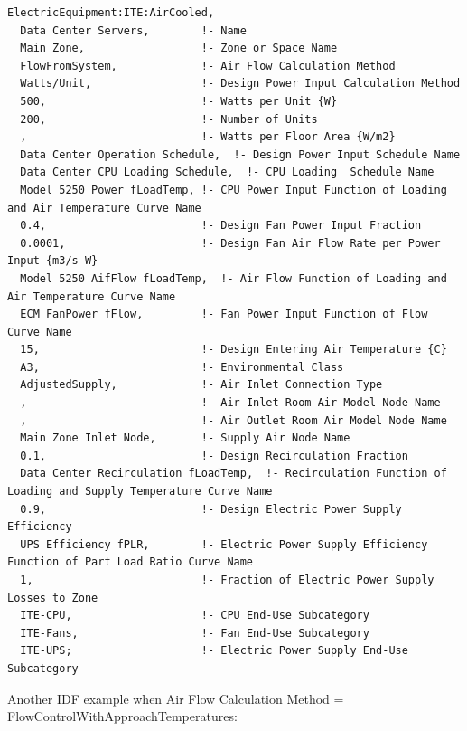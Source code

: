 \begin{lstlisting}
ElectricEquipment:ITE:AirCooled,
  Data Center Servers,        !- Name
  Main Zone,                  !- Zone or Space Name
  FlowFromSystem,             !- Air Flow Calculation Method
  Watts/Unit,                 !- Design Power Input Calculation Method
  500,                        !- Watts per Unit {W}
  200,                        !- Number of Units
  ,                           !- Watts per Floor Area {W/m2}
  Data Center Operation Schedule,  !- Design Power Input Schedule Name
  Data Center CPU Loading Schedule,  !- CPU Loading  Schedule Name
  Model 5250 Power fLoadTemp, !- CPU Power Input Function of Loading and Air Temperature Curve Name
  0.4,                        !- Design Fan Power Input Fraction
  0.0001,                     !- Design Fan Air Flow Rate per Power Input {m3/s-W}
  Model 5250 AifFlow fLoadTemp,  !- Air Flow Function of Loading and Air Temperature Curve Name
  ECM FanPower fFlow,         !- Fan Power Input Function of Flow Curve Name
  15,                         !- Design Entering Air Temperature {C}
  A3,                         !- Environmental Class
  AdjustedSupply,             !- Air Inlet Connection Type
  ,                           !- Air Inlet Room Air Model Node Name
  ,                           !- Air Outlet Room Air Model Node Name
  Main Zone Inlet Node,       !- Supply Air Node Name
  0.1,                        !- Design Recirculation Fraction
  Data Center Recirculation fLoadTemp,  !- Recirculation Function of Loading and Supply Temperature Curve Name
  0.9,                        !- Design Electric Power Supply Efficiency
  UPS Efficiency fPLR,        !- Electric Power Supply Efficiency Function of Part Load Ratio Curve Name
  1,                          !- Fraction of Electric Power Supply Losses to Zone
  ITE-CPU,                    !- CPU End-Use Subcategory
  ITE-Fans,                   !- Fan End-Use Subcategory
  ITE-UPS;                    !- Electric Power Supply End-Use Subcategory
\end{lstlisting}

Another IDF example when Air Flow Calculation Method = FlowControlWithApproachTemperatures:

